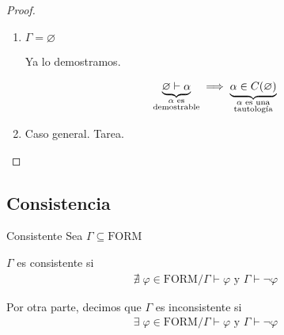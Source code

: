 \begin{proof} \phantom{.}

    \begin{enumerate}[%
                    labelindent=*,
                    style=multiline,
                    leftmargin=*,
                    align=left,
                    leftmargin=2\parindent,
                    label=Caso \arabic*)]
        \item $\Gamma = \varnothing$

            Ya lo demostramos.

            \begin{gather*}
                \underbrace{\varnothing \vdash \alpha}_{%
                \substack{\alpha \text{ es} \\ \text{demostrable}}} 
                \implies \underbrace{\alpha \in C(\varnothing)}_{%
                \substack{\alpha \text{ es una}\\\text{tautología}}}
            \end{gather*}
        
        \item Caso general. Tarea.
    \end{enumerate}
\end{proof}


\subsection{Consistencia}
\begin{definicion}{Consistente}{}
    Sea $\Gamma \subseteq \mathrm{FORM}$

    \medskip

    $\Gamma$ es consistente si 
    \begin{gather*}
        \nexists \; \varphi \in \mathrm{FORM}/
        \Gamma\vdash\varphi \text{ y } \Gamma \vdash \neg \varphi
    \end{gather*}
    
    \medskip

    Por otra parte, decimos que $\Gamma$ es inconsistente si
    \begin{gather*}
        \exists \; \varphi \in \mathrm{FORM} /
        \Gamma \vdash \varphi \text{ y } \Gamma \vdash \neg \varphi
    \end{gather*}
\end{definicion}


